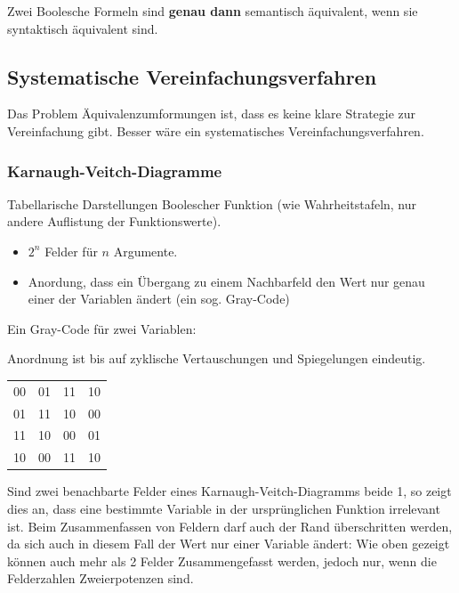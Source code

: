 \documentclass[12pt]{report}
\begin{document}
\begin{center}
  Zwei Boolesche Formeln sind \textbf{genau dann} semantisch äquivalent, wenn sie syntaktisch äquivalent sind.
\end{center}


\subsection{Systematische Vereinfachungsverfahren}
Das Problem Äquivalenzumformungen ist, dass es keine klare Strategie zur Vereinfachung gibt.
Besser wäre ein systematisches Vereinfachungsverfahren.

\subsubsection{Karnaugh-Veitch-Diagramme}
\begin{defbox}
  Tabellarische Darstellungen Boolescher
  Funktion (wie Wahrheitstafeln, nur andere Auflistung der Funktionswerte).
  \begin{itemize}
    \item $2^n$ Felder für $n$ Argumente.
    \item Anordung, dass ein Übergang zu einem Nachbarfeld den Wert nur genau einer der Variablen ändert (ein sog. Gray-Code)
  \end{itemize}
\end{defbox}

\begin{exbox}
  \begin{minipage}{0.6\textwidth}
    Ein Gray-Code für zwei Variablen:
    
    Anordnung ist bis auf zyklische Vertauschungen und Spiegelungen eindeutig.
  \end{minipage}
  \hfill
  \begin{minipage}{0.3\textwidth}
    \begin{tabular}{cccc}
      00 & 01 & 11 & 10 \\
      01 & 11 & 10 & 00 \\
      11 & 10 & 00 & 01 \\
      10 & 00 & 11 & 10 \\
    \end{tabular}
  \end{minipage}
\end{exbox}
Sind zwei benachbarte Felder eines Karnaugh-Veitch-Diagramms beide 1, so zeigt dies an, dass eine bestimmte Variable in der ursprünglichen Funktion irrelevant ist.
Beim Zusammenfassen von Feldern darf auch der Rand überschritten werden, da sich auch in diesem Fall der Wert nur einer Variable ändert:
Wie oben gezeigt können auch mehr als 2 Felder Zusammengefasst werden, jedoch nur, wenn die Felderzahlen Zweierpotenzen sind.
\end{document}
